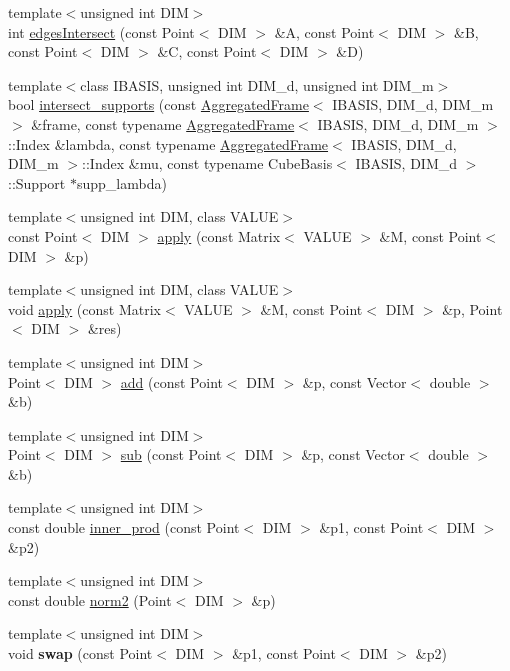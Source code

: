 \begin{CompactItemize}
\item 
{\footnotesize template$<$unsigned int DIM$>$ }\\int \hyperlink{namespaceFrameTL_179a53ae796b31d73b591456b7e8240e}{edgesIntersect} (const Point$<$ DIM $>$ \&A, const Point$<$ DIM $>$ \&B, const Point$<$ DIM $>$ \&C, const Point$<$ DIM $>$ \&D)
\item 
{\footnotesize template$<$class IBASIS, unsigned int DIM\_\-d, unsigned int DIM\_\-m$>$ }\\bool \hyperlink{namespaceFrameTL_0b6d3a80be9f0dd032527c3c17ce3f62}{intersect\_\-supports} (const \hyperlink{classFrameTL_1_1AggregatedFrame}{AggregatedFrame}$<$ IBASIS, DIM\_\-d, DIM\_\-m $>$ \&frame, const typename \hyperlink{classFrameTL_1_1AggregatedFrame}{AggregatedFrame}$<$ IBASIS, DIM\_\-d, DIM\_\-m $>$::Index \&lambda, const typename \hyperlink{classFrameTL_1_1AggregatedFrame}{AggregatedFrame}$<$ IBASIS, DIM\_\-d, DIM\_\-m $>$::Index \&mu, const typename CubeBasis$<$ IBASIS, DIM\_\-d $>$::Support $\ast$supp\_\-lambda)
\item 
{\footnotesize template$<$unsigned int DIM, class VALUE$>$ }\\const Point$<$ DIM $>$ \hyperlink{namespaceFrameTL_110b0b11455f5d648c2cb3a7866f3900}{apply} (const Matrix$<$ VALUE $>$ \&M, const Point$<$ DIM $>$ \&p)
\item 
{\footnotesize template$<$unsigned int DIM, class VALUE$>$ }\\void \hyperlink{namespaceFrameTL_7f2d7a0a9f79b15e8d82ff8363d06bb5}{apply} (const Matrix$<$ VALUE $>$ \&M, const Point$<$ DIM $>$ \&p, Point$<$ DIM $>$ \&res)
\item 
{\footnotesize template$<$unsigned int DIM$>$ }\\Point$<$ DIM $>$ \hyperlink{namespaceFrameTL_fd9af4210f87f330a600bdba74ca3f6d}{add} (const Point$<$ DIM $>$ \&p, const Vector$<$ double $>$ \&b)
\item 
{\footnotesize template$<$unsigned int DIM$>$ }\\Point$<$ DIM $>$ \hyperlink{namespaceFrameTL_ab03f9658bfef63434301affb3b5803a}{sub} (const Point$<$ DIM $>$ \&p, const Vector$<$ double $>$ \&b)
\item 
{\footnotesize template$<$unsigned int DIM$>$ }\\const double \hyperlink{namespaceFrameTL_b442ddca04900a00608a3963348b15bb}{inner\_\-prod} (const Point$<$ DIM $>$ \&p1, const Point$<$ DIM $>$ \&p2)
\item 
{\footnotesize template$<$unsigned int DIM$>$ }\\const double \hyperlink{namespaceFrameTL_6fd34de92145c0f42b41f9b36a379e9f}{norm2} (Point$<$ DIM $>$ \&p)
\item 
\hypertarget{namespaceFrameTL_d1c8aa47dd1f4024c97146dd88d48a72}{
{\footnotesize template$<$unsigned int DIM$>$ }\\void \textbf{swap} (const Point$<$ DIM $>$ \&p1, const Point$<$ DIM $>$ \&p2)}
\label{namespaceFrameTL_d1c8aa47dd1f4024c97146dd88d48a72}


\end{CompactItemize}
